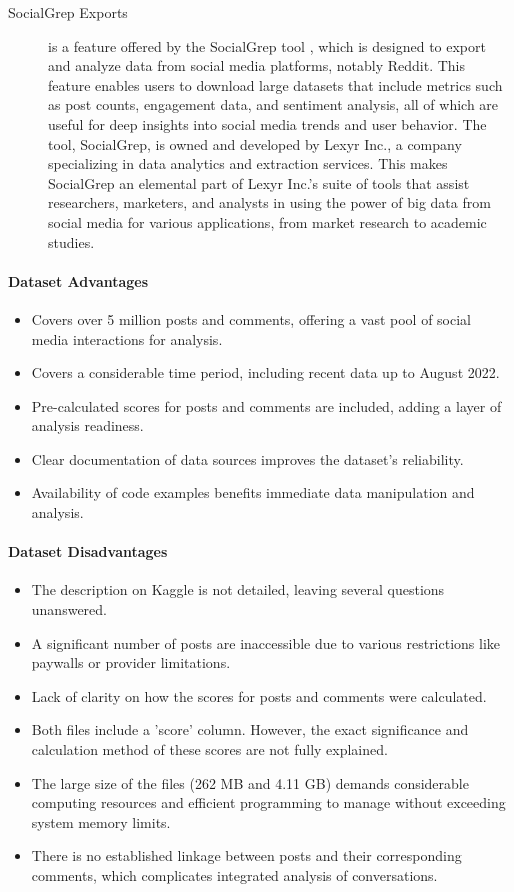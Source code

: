 \begin{description}
    \item[SocialGrep Exports] is a feature offered by the SocialGrep tool \cite{SocialGrepExports}, which is designed to export and analyze data from social media platforms, notably Reddit. This feature enables users to download large datasets that include metrics such as post counts, engagement data, and sentiment analysis, all of which are useful for deep insights into social media trends and user behavior. The tool, SocialGrep, is owned and developed by Lexyr Inc., a company specializing in data analytics and extraction services. This makes SocialGrep an elemental part of Lexyr Inc.'s suite of tools that assist researchers, marketers, and analysts in using the power of big data from social media for various applications, from market research to academic studies.
\end{description}

\paragraph{Dataset Advantages}
\begin{itemize}
    \item Covers over 5 million posts and comments, offering a vast pool of social media interactions for analysis.
    \item Covers a considerable time period, including recent data up to August 2022.
    \item Pre-calculated scores for posts and comments are included, adding a layer of analysis readiness.
    \item Clear documentation of data sources improves the dataset's reliability.
    \item Availability of code examples benefits immediate data manipulation and analysis.
\end{itemize}

\paragraph{Dataset Disadvantages}
\begin{itemize}
    \item The description on Kaggle is not detailed, leaving several questions unanswered.
    \item A significant number of posts are inaccessible due to various restrictions like paywalls or provider limitations.
    \item Lack of clarity on how the scores for posts and comments were calculated.
    \item Both files include a 'score' column. However, the exact significance and calculation method of these scores are not fully explained.
    \item The large size of the files (262 MB and 4.11 GB) demands considerable computing resources and efficient programming to manage without exceeding system memory limits.
    \item There is no established linkage between posts and their corresponding comments, which complicates integrated analysis of conversations.
\end{itemize}

